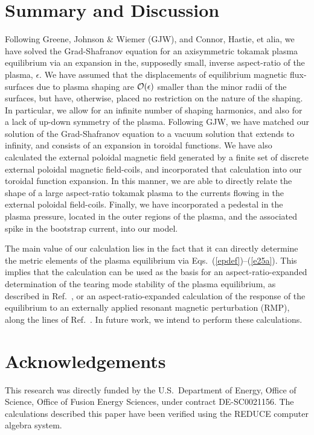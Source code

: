 \documentclass[12pt,prb,aps]{revtex4-1}
\begin{document}
\section{Summary and Discussion}\label{summary}
Following Greene, Johnson \& Wiemer (GJW),\cite{greene} and Connor, Hastie, et alia,\cite{con0,con,gim,fitz93} we have solved the
Grad-Shafranov equation for an axisymmetric tokamak plasma equilibrium via an expansion in the, supposedly small,  inverse aspect-ratio of the plasma, $\epsilon$. 
We have assumed that the displacements of equilibrium magnetic flux-surfaces due to plasma shaping are ${\cal O}(\epsilon)$ smaller than the minor radii
of the surfaces, but have, otherwise, placed no restriction on the nature of the shaping. In particular, we allow for an infinite number
of shaping harmonics, and also for a lack of up-down symmetry of the plasma. Following GJW, we have matched our solution of the Grad-Shafranov
equation to a vacuum solution that extends to infinity, and consists of an expansion in toroidal functions. We have also calculated the external poloidal magnetic
field generated by a finite set of discrete external poloidal magnetic field-coils, and incorporated that calculation into our toroidal function expansion. 
In this manner, we are able to directly relate the shape of a large aspect-ratio tokamak plasma to the currents flowing in the external poloidal field-coils. 
Finally, we have  incorporated a pedestal in the plasma pressure, located in the outer regions of the plasma, and the associated spike in the bootstrap
current, into our model.  

The main value of our calculation lies in the fact that it can directly determine the metric elements of the plasma equilibrium
via Eqs.~(\ref{epdef})--(\ref{e25a}). This implies that the calculation can be used as the basis for an aspect-ratio-expanded determination 
of the tearing mode stability of the plasma equilibrium, as described in Ref.~, or an aspect-ratio-expanded 
calculation of the response of  the equilibrium to an externally applied resonant magnetic perturbation (RMP), along the lines of Ref.~. 
In future work, we intend to perform these calculations. 

\section*{Acknowledgements}
This research was directly funded by the U.S.\ Department of Energy, Office of Science, Office of Fusion Energy Sciences, under  contract DE-SC0021156. 
The calculations  described  this paper have been verified using the {\sc REDUCE} computer algebra system.
\end{document}
